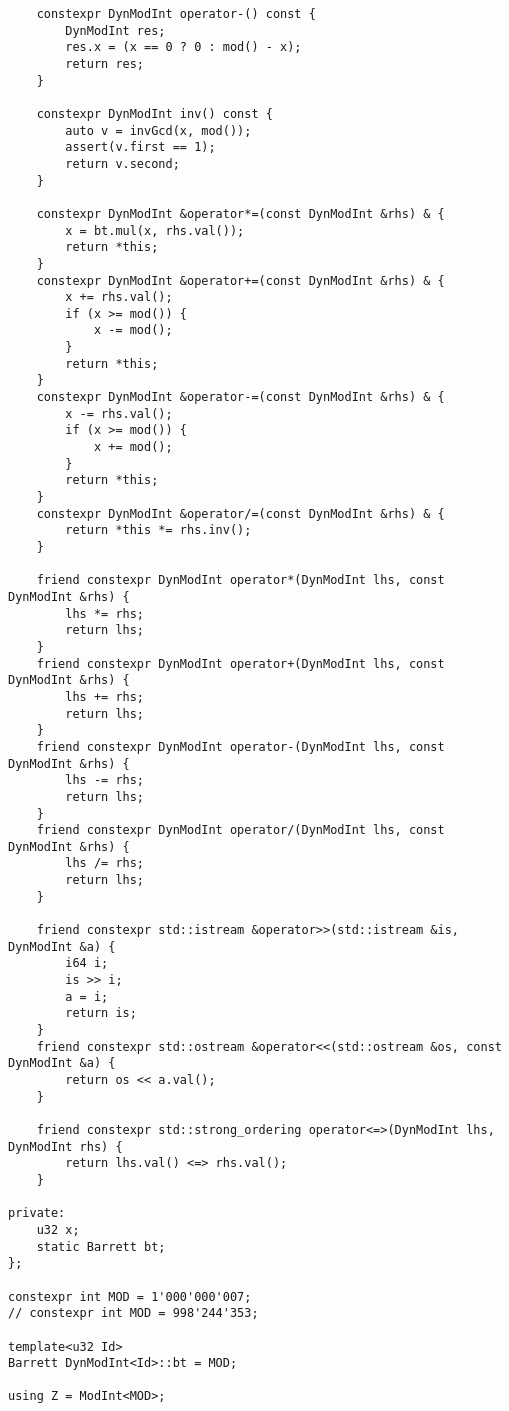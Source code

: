 \begin{lstlisting}
    constexpr DynModInt operator-() const {
        DynModInt res;
        res.x = (x == 0 ? 0 : mod() - x);
        return res;
    }
    
    constexpr DynModInt inv() const {
        auto v = invGcd(x, mod());
        assert(v.first == 1);
        return v.second;
    }
    
    constexpr DynModInt &operator*=(const DynModInt &rhs) & {
        x = bt.mul(x, rhs.val());
        return *this;
    }
    constexpr DynModInt &operator+=(const DynModInt &rhs) & {
        x += rhs.val();
        if (x >= mod()) {
            x -= mod();
        }
        return *this;
    }
    constexpr DynModInt &operator-=(const DynModInt &rhs) & {
        x -= rhs.val();
        if (x >= mod()) {
            x += mod();
        }
        return *this;
    }
    constexpr DynModInt &operator/=(const DynModInt &rhs) & {
        return *this *= rhs.inv();
    }
    
    friend constexpr DynModInt operator*(DynModInt lhs, const DynModInt &rhs) {
        lhs *= rhs;
        return lhs;
    }
    friend constexpr DynModInt operator+(DynModInt lhs, const DynModInt &rhs) {
        lhs += rhs;
        return lhs;
    }
    friend constexpr DynModInt operator-(DynModInt lhs, const DynModInt &rhs) {
        lhs -= rhs;
        return lhs;
    }
    friend constexpr DynModInt operator/(DynModInt lhs, const DynModInt &rhs) {
        lhs /= rhs;
        return lhs;
    }
    
    friend constexpr std::istream &operator>>(std::istream &is, DynModInt &a) {
        i64 i;
        is >> i;
        a = i;
        return is;
    }
    friend constexpr std::ostream &operator<<(std::ostream &os, const DynModInt &a) {
        return os << a.val();
    }
    
    friend constexpr std::strong_ordering operator<=>(DynModInt lhs, DynModInt rhs) {
        return lhs.val() <=> rhs.val();
    }
    
private:
    u32 x;
    static Barrett bt;
};

constexpr int MOD = 1'000'000'007;
// constexpr int MOD = 998'244'353;
 
template<u32 Id>
Barrett DynModInt<Id>::bt = MOD;
 
using Z = ModInt<MOD>;
\end{lstlisting}

